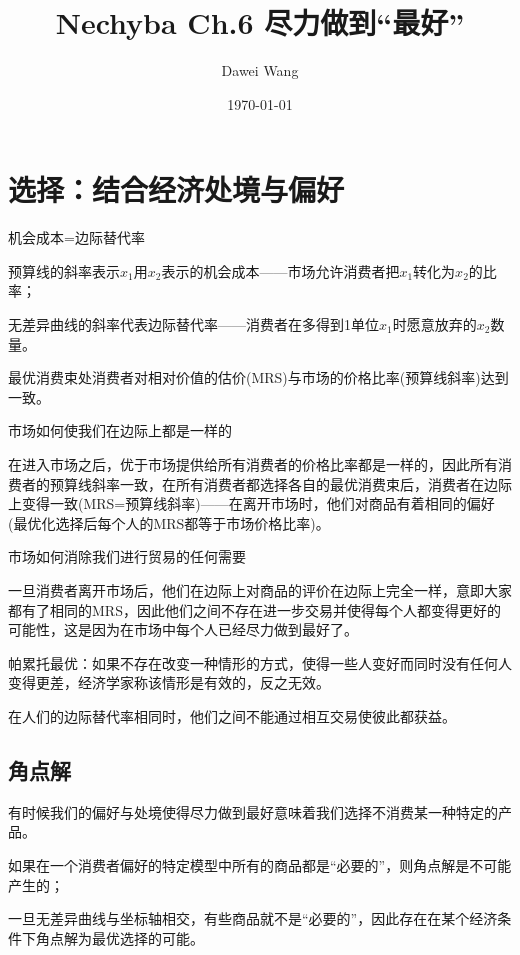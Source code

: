 \documentclass{article}
\title{Nechyba Ch.6 尽力做到“最好”}
\author{Dawei Wang}
\date{\today}
\begin{document}
	\maketitle
\section{选择：结合经济处境与偏好}
机会成本=边际替代率

预算线的斜率表示$ x_1 $用$ x_2 $表示的机会成本——市场允许消费者把$ x_1 $转化为$ x_2 $的比率；

无差异曲线的斜率代表边际替代率——消费者在多得到1单位$ x_1 $时愿意放弃的$ x_2 $数量。

最优消费束处消费者对相对价值的估价(MRS)与市场的价格比率(预算线斜率)达到一致。

\hspace*{\fill}

市场如何使我们在边际上都是一样的

在进入市场之后，优于市场提供给所有消费者的价格比率都是一样的，因此所有消费者的预算线斜率一致，在所有消费者都选择各自的最优消费束后，消费者在边际上变得一致(MRS=预算线斜率)——在离开市场时，他们对商品有着相同的偏好(最优化选择后每个人的MRS都等于市场价格比率)。

\hspace*{\fill}

市场如何消除我们进行贸易的任何需要

一旦消费者离开市场后，他们在边际上对商品的评价在边际上完全一样，意即大家都有了相同的MRS，因此他们之间不存在进一步交易并使得每个人都变得更好的可能性，这是因为在市场中每个人已经尽力做到最好了。

\hspace*{\fill}

帕累托最优：如果不存在改变一种情形的方式，使得一些人变好而同时没有任何人变得更差，经济学家称该情形是有效的，反之无效。

在人们的边际替代率相同时，他们之间不能通过相互交易使彼此都获益。

\subsection{角点解}
有时候我们的偏好与处境使得尽力做到最好意味着我们选择不消费某一种特定的产品。

\hspace*{\fill}

如果在一个消费者偏好的特定模型中所有的商品都是“必要的”，则角点解是不可能产生的；

一旦无差异曲线与坐标轴相交，有些商品就不是“必要的”，因此存在在某个经济条件下角点解为最优选择的可能。
\end{document}
